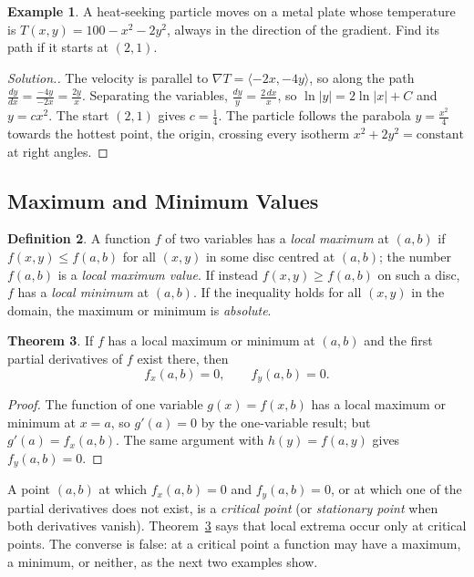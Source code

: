 \documentclass[11pt,a4paper]{article}
\theoremstyle{definition}
\newtheorem{thm}{Theorem}[subsection]
\newtheorem{defn}[thm]{Definition}
\newtheorem{exa}[thm]{Example}
\newenvironment{solution}
  {\renewcommand{\qedsymbol}{}\begin{proof}[\textit{Solution}.]}
  {\end{proof}}
\begin{document}
\begin{exa}
\label{ex:heatseeking}
A heat-seeking particle moves on a metal plate whose temperature is
$T(x,y) = 100 - x^2 - 2y^2$, always in the direction of the gradient. Find its
path if it starts at $(2,1)$.
\end{exa}

\begin{solution}
The velocity is parallel to $\nabla T = \langle -2x, -4y\rangle$, so along the
path $\frac{dy}{dx} = \frac{-4y}{-2x} = \frac{2y}{x}$. Separating the variables,
$\frac{dy}{y} = \frac{2\,dx}{x}$, so $\ln|y| = 2\ln|x| + C$ and $y = cx^2$. The
start $(2,1)$ gives $c = \frac14$. The particle follows the parabola
$y = \frac{x^2}{4}$ towards the hottest point, the origin, crossing every
isotherm $x^2 + 2y^2 = \text{constant}$ at right angles.
\end{solution}


{\color[wave]{485}\subsection{Maximum and Minimum Values}}

\begin{defn}
\label{defn:localext}
A function $f$ of two variables has a \emph{local maximum} at $(a,b)$ if
$f(x,y)\leq f(a,b)$ for all $(x,y)$ in some disc centred at $(a,b)$; the number
$f(a,b)$ is a \emph{local maximum value}. If instead $f(x,y)\geq f(a,b)$ on such
a disc, $f$ has a \emph{local minimum} at $(a,b)$. If the inequality holds for
all $(x,y)$ in the domain, the maximum or minimum is \emph{absolute}.
\end{defn}

\begin{thm}
\label{thm:fermat}
If $f$ has a local maximum or minimum at $(a,b)$ and the first partial
derivatives of $f$ exist there, then
\[f_x(a,b) = 0 ,\qquad f_y(a,b) = 0 .\]
\end{thm}

\begin{proof}
The function of one variable $g(x) = f(x,b)$ has a local maximum or minimum at
$x = a$, so $g'(a) = 0$ by the one-variable result; but $g'(a) = f_x(a,b)$. The
same argument with $h(y) = f(a,y)$ gives $f_y(a,b) = 0$.
\end{proof}

A point $(a,b)$ at which $f_x(a,b)=0$ and $f_y(a,b) =0$, or at which one of the
partial derivatives does not exist, is a \emph{critical point} (or
\emph{stationary point} when both derivatives vanish). Theorem~\ref{thm:fermat}
says that local extrema occur only at critical points. The converse is false: at
a critical point a function may have a maximum, a minimum, or neither, as the
next two examples show.
\end{document}
